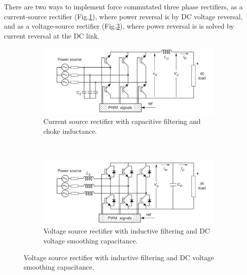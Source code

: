 There are two ways to implement force commutated three phase rectifiers, as a current-source rectifier (Fig.\ref{BASICMPC:fig:CSR}), where power reversal is by DC voltage reversal, and as a voltage-source rectifier (Fig.\ref{BASICMPC:fig:VSR}), where power reversal is is solved by current reversal at the DC link.


\begin{figure}[h]
                \centering
                \begin{subfigure}[b]{0.9\textwidth}
                    \includegraphics[width=\textwidth]{EMPC_PNG_Pics/BasicCurrentRectifiers.png}
                    \caption{\centering Current source rectifier with capacitive filtering and choke inductance.}
                    \label{BASICMPC:fig:CSR}
                \end{subfigure}
                ~ %
                \begin{subfigure}[b]{0.9\textwidth}
                    \includegraphics[width=\textwidth]{EMPC_PNG_Pics/BasicVoltageRectifiers.png}
                    \caption{\centering Voltage source rectifier with inductive filtering and DC voltage smoothing capacitance.}
                    \label{BASICMPC:fig:VSR}
                \end{subfigure}

\end{figure}

